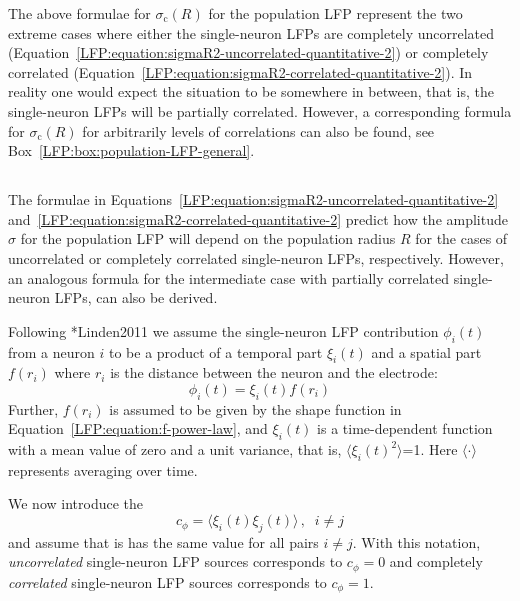 The above formulae for $\sigma_\text{c}(R)$ for the population LFP represent the two extreme cases where either the single-neuron
LFPs are completely uncorrelated (Equation~\ref{LFP:equation:sigmaR2-uncorrelated-quantitative-2}) or completely correlated 
(Equation~\ref{LFP:equation:sigmaR2-correlated-quantitative-2}). In reality one would expect the situation to be somewhere in between, that is,
the single-neuron LFPs will be partially correlated. However, a corresponding formula for $\sigma_\text{c}(R)$ for arbitrarily levels of correlations can also be found, see Box~\ref{LFP:box:population-LFP-general}. 

 
 
 
\subsection{}
The formulae in Equations~\ref{LFP:equation:sigmaR2-uncorrelated-quantitative-2} 
and~\ref{LFP:equation:sigmaR2-correlated-quantitative-2} predict how the amplitude  $\sigma$ 
for the population LFP will depend on the population radius $R$ for the cases of uncorrelated or completely correlated
single-neuron LFPs, respectively. However, an analogous formula for the intermediate case with partially correlated single-neuron LFPs, can
also be derived.

Following \citeasnoun**{Linden2011} we assume the single-neuron LFP contribution $\phi_i(t)$ from a neuron $i$ to be a product of a 
temporal part $\xi_i(t)$ and a spatial part $f(r_i)$ where $r_i$ is the distance between the neuron and the electrode:
\begin{equation}  
\phi_i(t)= \xi_i(t) f(r_i)
\label{LFP:box:equation:phii}
\end{equation}
Further, $f(r_i)$ is assumed to be given by the shape function in 
Equation~\ref{LFP:equation:f-power-law}, and $\xi_i(t)$ is a time-dependent function with a mean value of zero and a unit variance, that is,
$\langle \xi_i(t)^2 \rangle$=1. Here $\langle \cdot \rangle$ represents averaging over time.

We now introduce the  
\begin{equation}
c_\phi=\langle \xi_i(t) \xi_j(t)\rangle\, ,\;\; i \neq j
\label{LFP:box:equation:phii}
\end{equation}
and assume that is has the same value for all pairs $i \neq j$. With this notation,  
\emph{uncorrelated} single-neuron LFP sources corresponds to $c_\phi=0$ and 
completely \emph{correlated} single-neuron LFP sources corresponds to $c_\phi=1$.

